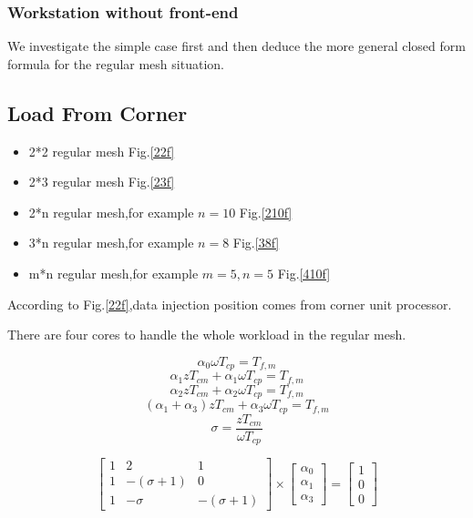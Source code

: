 \subsubsection{Workstation without front-end}

\vspace*{50pt}

We investigate the simple case first and then deduce the more general closed form formula for the regular mesh situation.

\subsection{Load From Corner}
\begin{itemize}

\item 2*2 regular mesh Fig.\ref{22f}
\item 2*3 regular mesh Fig.\ref{23f}
\item 2*n regular mesh,for example $n = 10$ Fig.\ref{210f}
\item 3*n regular mesh,for example $n = 8$ Fig.\ref{38f}
\item m*n regular mesh,for example $m = 5, n = 5$ Fig.\ref{410f}

\end{itemize}

According to Fig.\ref{22f},data injection position comes from corner unit processor.

There are four cores to handle the whole workload in the regular mesh.

$$\alpha_{0} \omega T_{cp} = T_{f,m}$$ 
$$\alpha_{1}zT_{cm} + \alpha_{1} \omega T_{cp} = T_{f,m}$$
$$\alpha_{2}zT_{cm} + \alpha_{2} \omega T_{cp} = T_{f,m}$$
$$(\alpha_{1} + \alpha_{3})zT_{cm} + \alpha_{3}\omega T_{cp} = T_{f,m}$$
$$\sigma = \frac{zT_{cm}}{\omega T_{cp}}$$

\begin{equation}
{
\left[ \begin{array}{ccc}
1 & 2 & 1\\
1 & -(\sigma + 1) & 0\\
1 & -\sigma & -(\sigma + 1)
\end{array} 
\right ]} \times \left[ \begin{array}{c}
\alpha_{0} \\
\alpha_{1} \\
\alpha_{3} 
\end{array} 
\right ] = \left[ \begin{array}{c}
1 \\
0 \\
0 
\end{array} 
\right ]
\end{equation}

